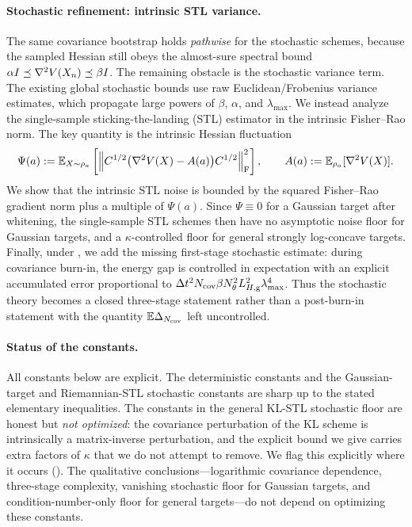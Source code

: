 \paragraph{Stochastic refinement: intrinsic STL variance.}
The same covariance bootstrap holds \emph{pathwise} for the stochastic schemes, because
the sampled Hessian still obeys the almost-sure spectral bound
$\alpha I\preceq\nabla^2V(X_n)\preceq\beta I$. The remaining obstacle is the stochastic
variance term. The existing global stochastic bounds use raw Euclidean/Frobenius
variance estimates, which propagate large powers of $\beta$, $\alpha$, and
$\lambda_{\max}$. We instead analyze the single-sample sticking-the-landing (STL)
estimator in the intrinsic Fisher--Rao norm. The key quantity is the intrinsic Hessian
fluctuation
\[
    \Psi(a)
    :=
    \mathbb{E}_{X\sim\rho_a}
    \left[
        \left\lVert 
            C^{1/2}\bigl(\nabla^2V(X)-A(a)\bigr)C^{1/2}
        \right\rVert_{\mathrm{F}}^2
    \right],
    \qquad
    A(a):=\mathbb{E}_{\rho_a}[\nabla^2V(X)].
\]
We show that the intrinsic STL noise is bounded by the squared Fisher--Rao gradient norm
plus a multiple of $\Psi(a)$. Since $\Psi\equiv0$ for a Gaussian target after whitening,
the single-sample STL schemes then have no asymptotic noise floor for Gaussian targets,
and a $\kappa$-controlled floor for general strongly log-concave targets. Finally, under
, we add the missing first-stage stochastic estimate: during
covariance burn-in, the energy gap is controlled in expectation with an explicit accumulated
error proportional to $\Delta t^2 N_{\mathrm{cov}}\beta N_\theta^2L_{H,\mathrm g}^2\lambda_{\max}^4$. Thus the
stochastic theory becomes a closed three-stage statement rather than a post-burn-in statement
with the quantity $\mathbb{E}\Delta_{N_{\mathrm{cov}}}$ left uncontrolled.

\paragraph{Status of the constants.}
All constants below are explicit. The deterministic constants and the Gaussian-target
and Riemannian-STL stochastic constants are sharp up to the stated elementary
inequalities. The constants in the general KL-STL stochastic floor are honest but
\emph{not optimized}: the covariance perturbation of the KL scheme is intrinsically a
matrix-inverse perturbation, and the explicit bound we give carries extra factors of
$\kappa$ that we do not attempt to remove. We flag this explicitly where it occurs
(). The qualitative conclusions---logarithmic covariance
dependence, three-stage complexity, vanishing stochastic floor for Gaussian targets, and
condition-number-only floor for general targets---do not depend on optimizing these
constants.

